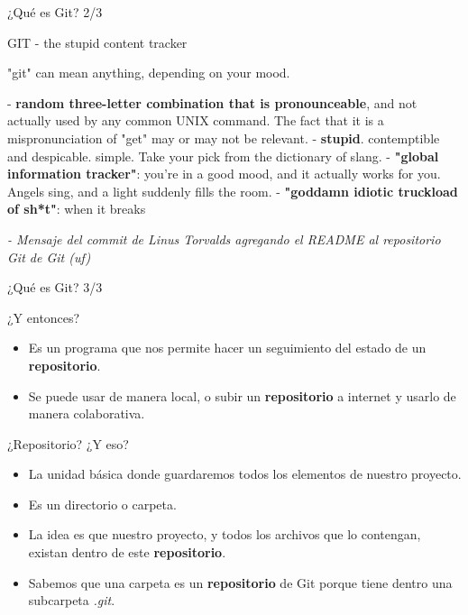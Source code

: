 \begin{frame}{¿Qué es Git? 2/3}
    \begin{center}
        \begin{block}{GIT - the stupid content tracker}

            "git" can mean anything, depending on your mood.
            
             - \textbf{random three-letter combination that is pronounceable}, and not actually used by any common UNIX command.  The fact that it is a mispronunciation of "get" may or may not be relevant.\newline
             - \textbf{stupid}. contemptible and despicable. simple. Take your pick from the dictionary of slang.\newline
             - \textbf{"global information tracker"}: you're in a good mood, and it actually works for you. Angels sing, and a light suddenly fills the room. \newline
             - \textbf{"goddamn idiotic truckload of sh*t"}: when it breaks
        \end{block}
    \end{center}
    \pause
    \textit{ - Mensaje del commit de Linus Torvalds agregando el README al repositorio Git de Git (uf)}
    
\end{frame}


\begin{frame}{¿Qué es Git? 3/3}
\begin{center}
    \begin{block} {¿Y entonces?}
        \begin{itemize}
            \item Es un programa que nos permite hacer un seguimiento del estado de un \textbf{repositorio}.
            \pause
            \item Se puede usar de manera local, o subir un \textbf{repositorio} a internet y usarlo de manera colaborativa. 
        \end{itemize}
    \end{block}
\end{center}
\pause
    \begin{block}{¿Repositorio? ¿Y eso?}
    \begin{itemize}
        \pause
        \item La unidad básica donde guardaremos todos los elementos de nuestro proyecto.
        \pause
        \item Es un directorio o carpeta.
        \pause
        \item La idea es que nuestro proyecto, y todos los archivos que lo contengan, existan dentro de este \textbf{repositorio}.
        \pause
        \item Sabemos que una carpeta es un \textbf{repositorio} de Git porque tiene dentro una subcarpeta \textit{.git}.
    \end{itemize}

    \end{block}
    
\end{frame}

